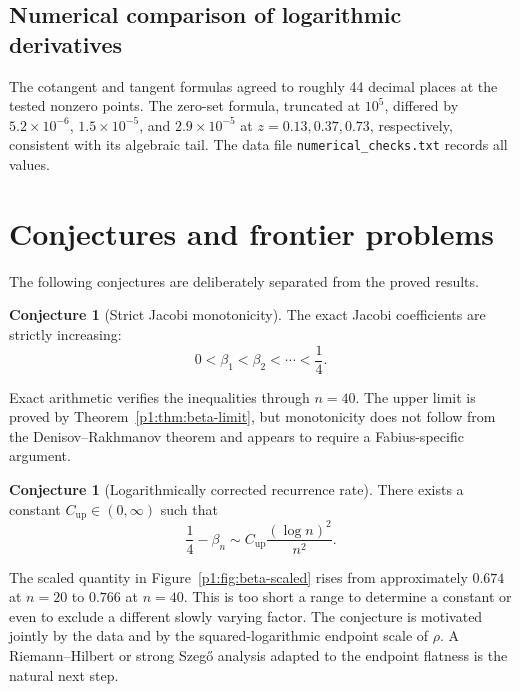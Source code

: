 \documentclass[11pt]{article}
\theoremstyle{definition}
\newtheorem{conjecture}[theorem]{Conjecture}
\theoremstyle{remark}
\newcommand{\Up}{\operatorname{up}}
\begin{document}
\subsection{Numerical comparison of logarithmic derivatives}

The cotangent and tangent formulas agreed to roughly 44 decimal places at the tested
nonzero points.  The zero-set formula, truncated at \(10^5\), differed by
\(5.2\times10^{-6}\), \(1.5\times10^{-5}\), and \(2.9\times10^{-5}\) at
\(z=0.13,0.37,0.73\), respectively, consistent with its algebraic tail.  The data file
\texttt{numerical\_checks.txt} records all values.

\section{Conjectures and frontier problems}

The following conjectures are deliberately separated from the proved results.

\begin{conjecture}[Strict Jacobi monotonicity]\label{p1:conj:beta-monotone}
The exact Jacobi coefficients are strictly increasing:
\begin{equation}
 0<\beta_1<\beta_2<\cdots<\frac14.                            \label{p1:eq:beta-monotone}
\end{equation}
\end{conjecture}

Exact arithmetic verifies the inequalities through \(n=40\).  The upper limit is proved by
Theorem~\ref{p1:thm:beta-limit}, but monotonicity does not follow from the
Denisov--Rakhmanov theorem and appears to require a Fabius-specific argument.

\begin{conjecture}[Logarithmically corrected recurrence rate]\label{p1:conj:beta-rate}
There exists a constant \(C_{\Up}\in(0,\infty)\) such that
\begin{equation}
 \frac14-\beta_n
 \sim C_{\Up}\frac{(\log n)^2}{n^2}.                         \label{p1:eq:beta-rate}
\end{equation}
\end{conjecture}

The scaled quantity in Figure~\ref{p1:fig:beta-scaled} rises from approximately \(0.674\) at
\(n=20\) to \(0.766\) at \(n=40\).  This is too short a range to determine a constant or
even to exclude a different slowly varying factor.  The conjecture is motivated jointly by
the data and by the squared-logarithmic endpoint scale of \(\rho\).  A Riemann--Hilbert or
strong Szeg\H{o} analysis adapted to the endpoint flatness is the natural next step.
\end{document}
